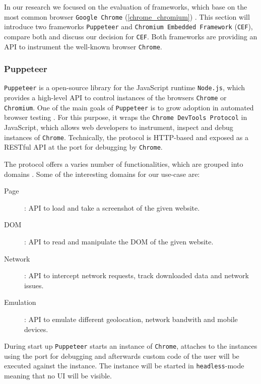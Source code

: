 In our research we focused on the evaluation of frameworks, which base on the most common browser \texttt{Google Chrome} (\ref{chrome_chromium}) \cite{CommonBrowsers}. This section will introduce two frameworks \texttt{Puppeteer} and \texttt{Chromium Embedded Framework} (\texttt{CEF}), compare both and discuss our decision for \texttt{CEF}. Both frameworks are providing an API to instrument the well-known browser \texttt{Chrome}.

\subsubsection{Puppeteer}
\texttt{Puppeteer} is a open-source library for the JavaScript runtime \texttt{Node.js}, which provides a high-level API to control instances of the browsers \texttt{Chrome} or \texttt{Chromium}. One of the main goals of \texttt{Puppeteer} is to grow adoption in automated browser testing \cite{PuppeteerFAQ}.  For this purpose, it wraps the \texttt{Chrome DevTools Protocol} in JavaScript, which allows web developers to instrument, inspect and debug instances of \texttt{Chrome}. Technically, the protocol is HTTP-based and exposed as a RESTful API at the port for debugging by \texttt{Chrome}.

The protocol offers a varies number of functionalities, which are grouped into domains \cite{DevToolsProtocol}. Some of the interesting domains for our use-case are:
\begin{description}
	\item[Page]: API to load and take a screenshot of the given website.
	\item[DOM]: API to read and manipulate the DOM of the given website.
	\item[Network]: API to intercept network requests, track downloaded data and network issues.
	\item[Emulation]: API to emulate different geolocation, network bandwith and mobile devices.
\end{description}

During start up \texttt{Puppeteer} starts an instance of \texttt{Chrome}, attaches to the instances using the port for debugging and afterwards custom code of the user will be executed against the instance. The instance will be started in \texttt{headless}-mode meaning that no UI will be visible.

